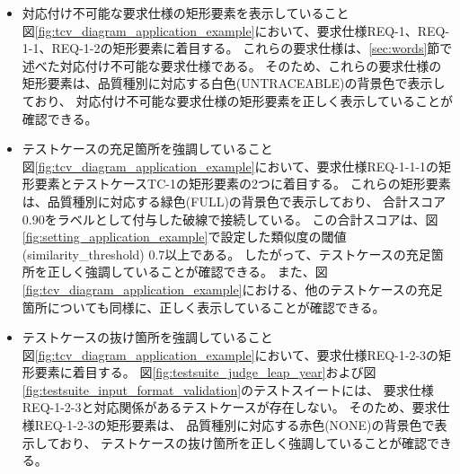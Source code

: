 \begin{itemize}
    \item 対応付け不可能な要求仕様の矩形要素を表示していること\\                                                                                     
    図\ref{fig:tcv_diagram_application_example}において、要求仕様REQ-1、REQ-1-1、REQ-1-2の矩形要素に着目する。                                                
    これらの要求仕様は、\ref{sec:words}節で述べた対応付け不可能な要求仕様である。                                                  
    そのため、これらの要求仕様の矩形要素は、品質種別に対応する白色(UNTRACEABLE)の背景色で表示しており、                                                                   
    対応付け不可能な要求仕様の矩形要素を正しく表示していることが確認できる。

    \item テストケースの充足箇所を強調していること\\                                                                             
    図\ref{fig:tcv_diagram_application_example}において、要求仕様REQ-1-1-1の矩形要素とテストケースTC-1の矩形要素の2つに着目する。
    これらの矩形要素は、品質種別に対応する緑色(FULL)の背景色で表示しており、
    合計スコア0.90をラベルとして付与した破線で接続している。
    この合計スコアは、図\ref{fig:setting_application_example}で設定した類似度の閾値 (similarity\_threshold) 0.7以上である。
    したがって、テストケースの充足箇所を正しく強調していることが確認できる。
    また、図\ref{fig:tcv_diagram_application_example}における、他のテストケースの充足箇所についても同様に、正しく表示していることが確認できる。

    \item テストケースの抜け箇所を強調していること\\
    図\ref{fig:tcv_diagram_application_example}において、要求仕様REQ-1-2-3の矩形要素に着目する。               
    図\ref{fig:testsuite_judge_leap_year}および図\ref{fig:testsuite_input_format_validation}のテストスイートには、                    
    要求仕様REQ-1-2-3と対応関係があるテストケースが存在しない。                                   
    そのため、要求仕様REQ-1-2-3の矩形要素は、                                                     
    品質種別に対応する赤色(NONE)の背景色で表示しており、                                          
    テストケースの抜け箇所を正しく強調していることが確認できる。


\end{itemize}
